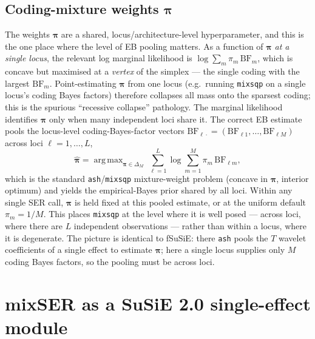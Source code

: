 \documentclass[11pt]{article}
\newcommand{\BF}{\mathrm{BF}}
\DeclareMathOperator*{\argmax}{arg\,max}
\theoremstyle{plain}
\theoremstyle{remark}
\begin{document}
\subsection{Coding-mixture weights $\bm\pi$}\label{sec:pi}
The weights $\bm\pi$ are a shared, locus/architecture-level hyperparameter, and
this is the one place where the level of EB pooling matters. As a function of
$\bm\pi$ \emph{at a single locus}, the relevant log marginal likelihood is
$\log\sum_m\pi_m\,\BF_{m}$, which is concave but maximised at a \emph{vertex} of
the simplex --- the single coding with the largest $\BF_m$. Point-estimating
$\bm\pi$ from one locus (e.g.\ running \texttt{mixsqp} on a single locus's coding
Bayes factors) therefore collapses all mass onto the sparsest coding; this is the
spurious ``recessive collapse'' pathology. The marginal likelihood identifies
$\bm\pi$ only when many independent loci share it. The correct EB estimate pools
the locus-level coding-Bayes-factor vectors $\BF_{\ell\cdot}=(\BF_{\ell 1},\dots,\BF_{\ell M})$
across loci $\ell=1,\dots,L$,
\begin{equation}\label{eq:ebpi}
\boxed{\;
  \widehat{\bm\pi}
  =\argmax_{\bm\pi\in\Delta_{M}}\ \sum_{\ell=1}^{L}\log\sum_{m=1}^{M}\pi_m\,\BF_{\ell m},
\;}
\end{equation}
which is the standard \texttt{ash}/\texttt{mixsqp} mixture-weight problem
(concave in $\bm\pi$, interior optimum) and yields the empirical-Bayes prior
shared by all loci. Within any single SER call, $\bm\pi$ is held fixed at this
pooled estimate, or at the uniform default $\pi_m=1/M$. This places
\texttt{mixsqp} at the level where it is well posed --- across loci, where there
are $L$ independent observations --- rather than within a locus, where it is
degenerate. The picture is identical to fSuSiE: there \texttt{ash} pools the $T$
wavelet coefficients of a single effect to estimate $\bm\pi$; here a single locus
supplies only $M$ coding Bayes factors, so the pooling must be across loci.

\section{mixSER as a SuSiE 2.0 single-effect module}\label{sec:susie}
\end{document}
